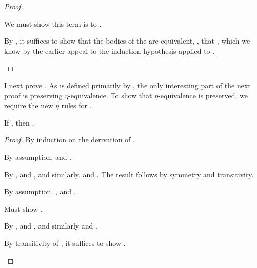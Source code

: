 {\begin{proof}
\begin{proofcases}
      We must show this term is  to \im{\cctrans{\sfune{\sx}{\sApr}{\sepr}}}.

      By , it suffices to show that the
      bodies of the  are equivalent, \ie, that \im{\te \equiv
        \cctrans{\sepr}}, which we know by the earlier appeal to the induction
      hypothesis applied to \im{\se \stepstar \sepr}.
  \end{proofcases}
\end{proof}

I next prove .
As  is defined primarily by , the only
interesting part of the next proof is preserving \(\eta\)-equivalence.
To show that \(\eta\)-equivalence is preserved, we require the new \(\eta\)
rules for .
\begin{lemma}
  \label{lem:abs-cc:cc:pres-equiv}
  If \im{\sequivjudg{\slenv}{\se}{\sepr}}, then
  \im{\tequivjudg{\cctrans{\slenv}}{\cctrans{\se}}{\cctrans{\sepr}}}.
\end{lemma}
\begin{proof}
  By induction on the derivation of \im{\se \equiv \sepr}.
  \begin{proofcases}
    \item {}

     By assumption, \im{\se \stepstar \seone} and \im{\sepr \stepstar \seone}.

     By , \im{\cctrans{\se} \stepstar \te} and \im{\te \equiv \cctrans{\seone}}, and
     similarly.
     \im{\cctrans{\sepr} \stepstar \tepr} and \im{\tepr \equiv \cctrans{\seone}}.
     The result follows by symmetry and transitivity.

    \item {}

    By assumption, \im{\se \stepstar \sfune{\sx}{\st}{\seone}}, \im{\sepr \stepstar \setwo} and
    \im{\seone \equiv \sappe{\setwo}{\sx}}.

    Must show \im{\cctrans{\se} \equiv \cctrans{\sepr}}.

    By , \im{\cctrans{\se} \stepstar \te} and \im{\te \equiv
      \cctrans{(\sfune{\sx}{\st}{\seone})}}, and similarly \im{\cctrans{\sepr} \stepstar \tepr} and \im{\tepr
      \equiv \cctrans{\setwo}}.

    By transitivity of \im{\equiv}, it suffices to show
    \im{\cctrans{(\sfune{\sx}{\st}{\seone})} \equiv \cctrans{\setwo}}.


\end{proofcases}
\end{proof}}
